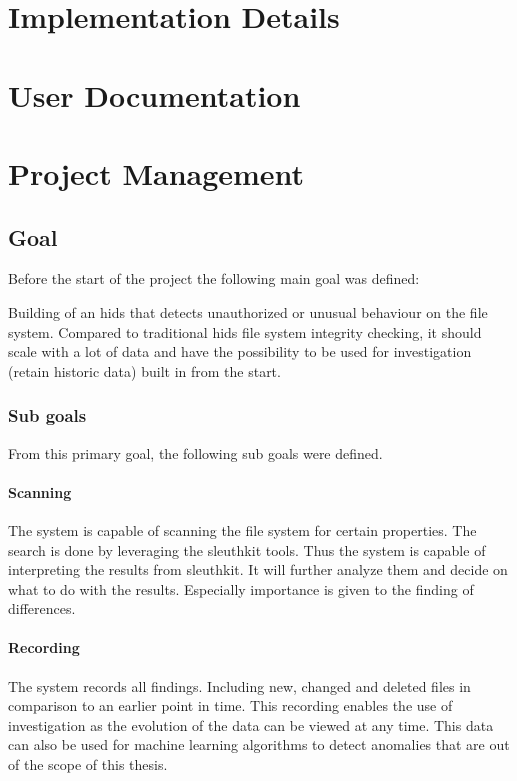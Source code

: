 \documentclass[
	a4paper,					%
	10pt,							%
	twoside,					%
	openright,				%
	notitlepage,			%
	parskip=half,			%
]{scrreprt}					%
\begin{document}
\chapter{Implementation Details}

\chapter{User Documentation}

\chapter{Project Management}

\section{Goal}
\label{apdx-sec:goal}
Before the start of the project the following main goal was defined:

Building of an \gls{hids} that detects unauthorized or unusual behaviour on the file system. Compared to traditional \gls{hids} file system integrity checking, it should scale with a lot of data and have the possibility to be used for investigation (retain historic data) built in from the start.

\subsection{Sub goals}

From this primary goal, the following sub goals were defined. 

\subsubsection{Scanning}
The system is capable of scanning the file system for certain properties. The search is done by leveraging the sleuthkit tools. Thus the system is capable of interpreting the results from sleuthkit. It will further analyze them and decide on what to do with the results. Especially importance is given to the finding of differences.

\subsubsection{Recording}
The system records all findings. Including new, changed and deleted files in comparison to an earlier point in time. This recording enables the use of investigation as the evolution of the data can be viewed at any time. This data can also be used for machine learning algorithms to detect anomalies that are out of the scope of this thesis. 
\end{document}

